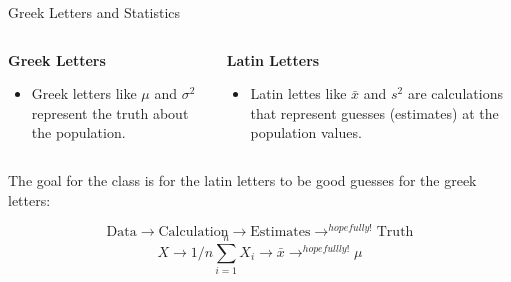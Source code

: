 \documentclass{beamer}
\begin{document}
\begin{frame}{Greek Letters and Statistics}
	\begin{columns}[onlytextwidth] %

		\begin{column}{.5\textwidth}
			\begin{center}
				\textbf{Greek Letters}
			\end{center}

			\begin{itemize}
				\item Greek letters like $\mu$ and $\sigma^2$ represent the truth about the population.
			\end{itemize}
		\end{column}%
		\hfill%

		\begin{column}{.5\textwidth}
			\begin{center}
				\textbf{Latin Letters}
			\end{center}

			\begin{itemize}
				\item Latin lettes like $\bar{x}$ and $s^2$ are calculations that represent guesses (estimates) at the population values.
			\end{itemize}
		\end{column}%
	\end{columns}
	
	\vspace{10mm}
	The goal for the class is for the latin letters to be good guesses for the greek letters:

	\[ 
		\text{Data} \longrightarrow \text{Calculation} \longrightarrow \text{Estimates} \longrightarrow^{hopefully!} \text{Truth}
	\]
	\[
		X \longrightarrow 1/n \sum_{i=1}^n X_i \longrightarrow \bar{x} \longrightarrow^{hopefullly!} \mu
	\]
\end{frame}
\end{document}
